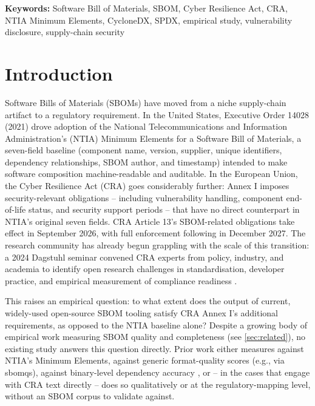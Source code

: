 \documentclass[11pt]{article}
\begin{document}
\textbf{Keywords:} Software Bill of Materials, SBOM, Cyber Resilience Act, CRA, NTIA Minimum Elements, CycloneDX, SPDX, empirical study, vulnerability disclosure, supply-chain security

\section{Introduction}
\label{sec:introduction}

Software Bills of Materials (SBOMs) have moved from a niche supply-chain artifact to a regulatory requirement. In the United States, Executive Order 14028 (2021) drove adoption of the National Telecommunications and Information Administration's (NTIA) Minimum Elements for a Software Bill of Materials, a seven-field baseline (component name, version, supplier, unique identifiers, dependency relationships, SBOM author, and timestamp) intended to make software composition machine-readable and auditable. In the European Union, the Cyber Resilience Act (CRA) goes considerably further: Annex I imposes security-relevant obligations -- including vulnerability handling, component end-of-life status, and security support periods -- that have no direct counterpart in NTIA's original seven fields. CRA Article 13's SBOM-related obligations take effect in September 2026, with full enforcement following in December 2027. The research community has already begun grappling with the scale of this transition: a 2024 Dagstuhl seminar convened CRA experts from policy, industry, and academia to identify open research challenges in standardisation, developer practice, and empirical measurement of compliance readiness \cite{dagstuhl2024}.

This raises an empirical question: to what extent does the output of current, widely-used open-source SBOM tooling satisfy CRA Annex I's additional requirements, as opposed to the NTIA baseline alone? Despite a growing body of empirical work measuring SBOM quality and completeness (see \cref{sec:related}), no existing study answers this question directly. Prior work either measures against NTIA's Minimum Elements, against generic format-quality scores (e.g., via sbomqs), against binary-level dependency accuracy \cite{jbomaudit}, or -- in the cases that engage with CRA text directly \cite{corti2025,ruohonen2025timmers,ruohonen2025gdpr} -- does so qualitatively or at the regulatory-mapping level, without an SBOM corpus to validate against.
\end{document}
